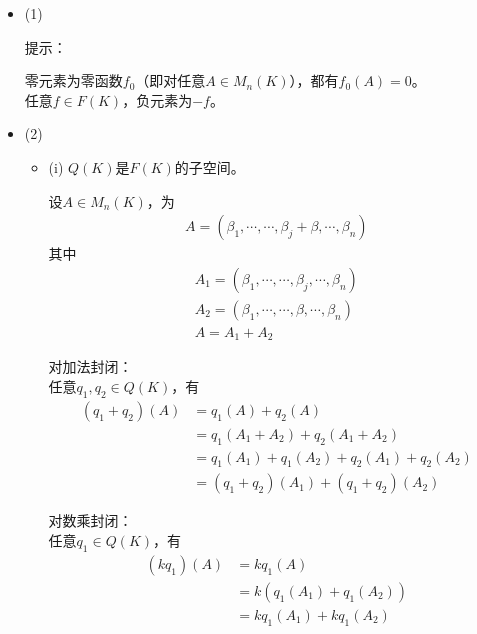 \documentclass{article}
\begin{document}
\begin{itemize}
  \item (1)

        提示：

        零元素为零函数$f_0$（即对任意$A \in M_n(K)$），都有$f_0(A) = 0$。\\
        任意$f \in F(K)$，负元素为$-f$。

  \item (2)

        \begin{itemize}
          \item (i) $Q(K)$是$F(K)$的子空间。

                设$A \in M_n(K)$，为
                \begin{align*}
                  A = (\beta_1, \cdots, \cdots, \beta_j + \beta, \cdots, \beta_n)
                \end{align*}
                其中
                \begin{align*}
                  A_1 = (\beta_1, \cdots, \cdots, \beta_j, \cdots, \beta_n) \\
                  A_2 = (\beta_1, \cdots, \cdots, \beta, \cdots, \beta_n)   \\
                  A = A_1 + A_2
                \end{align*}

                对加法封闭：\\
                任意$q_1, q_2 \in Q(K)$，有
                \begin{align*}
                  (q_1 + q_2) (A)
                   & = q_1(A) + q_2(A)                           \\
                   & = q_1(A_1 + A_2) + q_2(A_1 + A_2)           \\
                   & = q_1(A_1) + q_1(A_2) + q_2(A_1) + q_2(A_2) \\
                   & = (q_1 + q_2)(A_1) + (q_1 + q_2)(A_2)
                \end{align*}

                对数乘封闭：\\
                任意$q_1\in Q(K)$，有
                \begin{align*}
                  (kq_1)(A)
                   & = k q_1(A)                \\
                   & = k (q_1(A_1) + q_1(A_2)) \\
                   & = k q_1(A_1) + k q_1(A_2)
                \end{align*}


\end{itemize}
\end{itemize}
\end{document}
